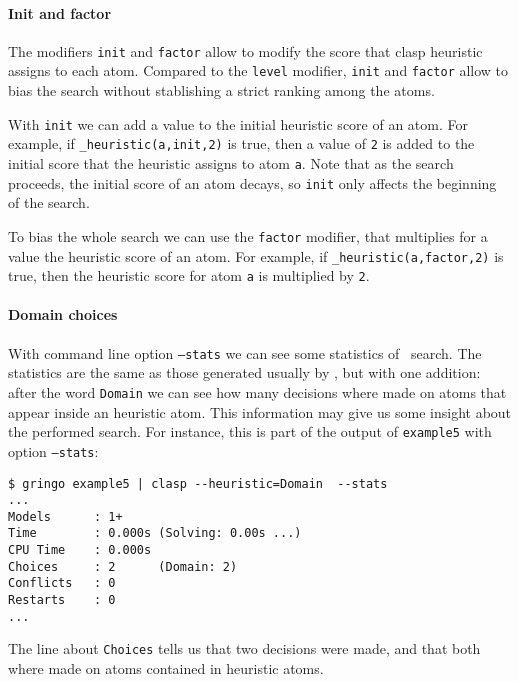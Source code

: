\paragraph{Init and factor}

The modifiers \texttt{init} and \texttt{factor} allow to modify the score that clasp heuristic assigns to each atom.  
Compared to the \texttt{level} modifier, \texttt{init} and \texttt{factor} allow to bias the search without stablishing a strict ranking among the atoms. 

With \texttt{init} we can add a value to the initial heuristic score of an atom. 
For example, if \texttt{\_heuristic(a,init,2)} is true, then a value of \texttt{2} is added to  
the initial score that the heuristic assigns to atom \texttt{a}. 
Note that as the search proceeds, the initial score of an atom decays, so \texttt{init} only affects the beginning of the search. 

To bias the whole search we can use the \texttt{factor} modifier,  
that multiplies for a value the heuristic score of an atom. 
For example, if \texttt{\_heuristic(a,factor,2)} is true, then the heuristic score for atom \texttt{a}  is multiplied by \texttt{2}. 

\paragraph{Domain choices}

With command line option \texttt{--stats} we can see some statistics of \clasp\ search. 
The statistics are the same as those generated usually by \clasp, but with one addition:  
after the word \texttt{Domain} we can see how many decisions where made on atoms that appear  inside an heuristic atom. 
This information may give us some insight about the performed search. 
For instance, this is part of the output of \texttt{example5} with option \texttt{--stats}: 
\begin{verbatim}
$ gringo example5 | clasp --heuristic=Domain  --stats                                                                       
...
Models      : 1+    
Time        : 0.000s (Solving: 0.00s ...)
CPU Time    : 0.000s
Choices     : 2      (Domain: 2)
Conflicts   : 0
Restarts    : 0     
...
\end{verbatim}

 The line about \texttt{Choices} tells us that  two decisions were made, and that both where made on atoms contained in heuristic atoms. 


